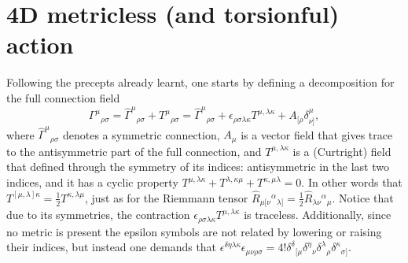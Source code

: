 \documentclass[twocolumn,
  showpacs,showkeys,prd,superscriptaddress]{revtex4-1}
\begin{document}
\section{4D metricless (and torsionful) action}

Following the precepts  already learnt, one starts  by defining a decomposition for the full connection field 
\begin{equation}
  \Gamma^\mu{}_{\rho\sigma} = \hat{\Gamma}^\mu{}_{\rho\sigma} + T^\mu{}_{\rho\sigma} = \hat{\Gamma}^\mu{}_{\rho\sigma} + \epsilon_{\rho\sigma\lambda\kappa}T^{\mu,\lambda\kappa}+A_{[\rho}\delta^\mu_{\nu]},
\end{equation}
where $\hat{\Gamma}^\mu{}_{\rho\sigma}$ denotes a symmetric connection, $A_\mu$ is a vector field  that gives trace to the antisymmetric part of the full connection, and  $T^{\mu,\lambda\kappa}$ is a (Curtright) field that  defined through the symmetry of its indices: antisymmetric in the last two indices, and it has a cyclic property $T^{\mu,\lambda\kappa}+T^{\lambda,\kappa\mu}+T^{\kappa,\mu\lambda}=0$. In other words that $T^{[\mu,\lambda]\kappa}=\frac{1}{2}T^{\kappa,\lambda\mu}$, just as for  the Riemmann tensor $\hat{R}_{\mu[\nu}{}^\alpha{}_{\lambda]}=\frac{1}{2}\hat{R}_{\lambda\nu}{}^\alpha{}_{\mu}$. Notice that due to its symmetries, the contraction $\epsilon_{\rho\sigma\lambda\kappa}T^{\mu,\lambda\kappa}$ is traceless. Additionally, since no metric is present  the epsilon symbols are not related by lowering or raising their indices, but instead one demands that $\epsilon^{\delta\eta\lambda\kappa}\epsilon_{\mu\nu\rho\sigma}=4!\delta^{\delta}{}_{[\mu}\delta^\eta{}_{\nu}\delta^{\lambda}{}_{\rho} \delta^\kappa{}_{\sigma]}$.
\end{document}
